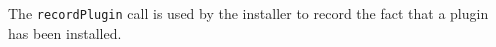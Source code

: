 The \verb+recordPlugin+ call is used by the installer to record the fact that a plugin
has been installed.
